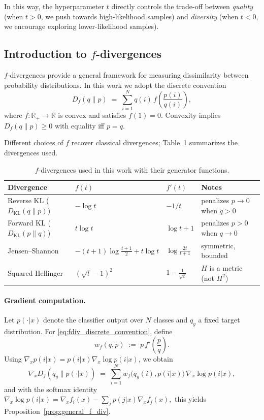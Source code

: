 \documentclass{article}
\begin{document}
\medskip
In this way, the hyperparameter $t$ directly controls the trade-off between 
\emph{quality} (when $t>0$, we push towards high-likelihood samples) and 
\emph{diversity} (when $t<0$, we encourage exploring lower-likelihood samples).

\subsection{Introduction to $f$-divergences}
\label{app:fdiv}

$f$-divergences \citep{csiszar1967information, ali1966general} provide a general framework for measuring dissimilarity
between probability distributions. In this work we adopt the discrete convention
\begin{equation}
D_f(q \| p) \;=\; \sum_{i=1}^N q(i)\, f\!\left(\frac{p(i)}{q(i)}\right),
\label{eq:fdiv_discrete_convention}
\end{equation}
where $f:\mathbb{R}_+\to\mathbb{R}$ is convex and satisfies $f(1)=0$. Convexity implies $D_f(q\|p)\ge 0$ with equality
iff $p=q$.

Different choices of $f$ recover classical divergences; Table~\ref{tab:f_divergences} summarizes the divergences used.

\begin{table}[h]
\centering
\caption{$f$-divergences used in this work with their generator functions.}
\label{tab:f_divergences}
\begin{tabular}{llll}
\toprule
Divergence & $f(t)$ & $f'(t)$ & Notes \\
\midrule
Reverse KL ($D_{\mathrm{KL}}(q\|p)$) & $-\log t$ & $-1/t$ & penalizes $p\!\to\!0$ when $q\!>\!0$ \\
Forward KL ($D_{\mathrm{KL}}(p\|q)$) & $t\log t$ & $\log t + 1$ & penalizes $p\!>\!0$ when $q\!\to\!0$ \\
Jensen--Shannon & $-(t+1)\log\frac{t+1}{2} + t\log t$ & $\log\frac{2t}{t+1}$ & symmetric, bounded \\
Squared Hellinger & $(\sqrt{t}-1)^2$ & $1-\frac{1}{\sqrt t}$ & $H$ is a metric (not $H^2$) \\
\bottomrule
\end{tabular}
\end{table}

\paragraph{Gradient computation.}
Let $p(\cdot|x)$ denote the classifier output over $N$ classes and $q_y$ a fixed target distribution.
For \eqref{eq:fdiv_discrete_convention}, define
\begin{equation}
w_f(q,p) \;:=\; p\, f'\!\left(\frac{p}{q}\right).
\label{eq:wf_def}
\end{equation}
Using $\nabla_x p(i|x)=p(i|x)\nabla_x\log p(i|x)$, we obtain
\begin{equation}
\nabla_x D_f(q_y\|p(\cdot|x))
\;=\;
\sum_{i=1}^N w_f\big(q_y(i),p(i|x)\big)\,\nabla_x\log p(i|x),
\label{eq:fdiv_grad_general}
\end{equation}
and with the softmax identity
\(
\nabla_x\log p(i|x)=\nabla_x f_i(x)-\sum_j p(j|x)\nabla_x f_j(x),
\)
this yields Proposition~\ref{prop:general_f_div}.
\end{document}
